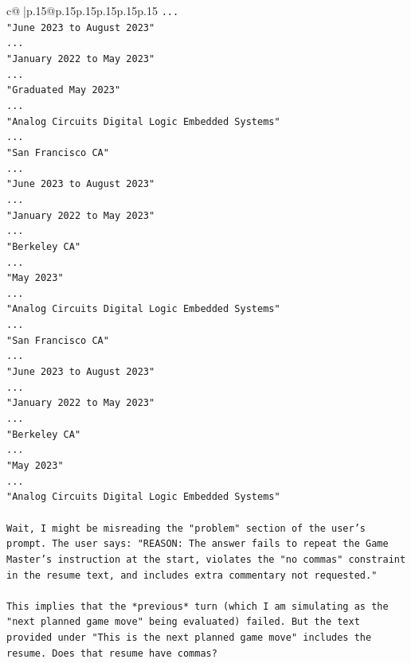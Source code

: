 \documentclass{article}
\begin{document}
{\begin{supertabular}{c@{$\;$}|p{.15\linewidth}@{}p{.15\linewidth}p{.15\linewidth}p{.15\linewidth}p{.15\linewidth}p{.15\linewidth}}
{{{\texttt{...} \\
\texttt{"June 2023 to August 2023"} \\
\texttt{...} \\
\texttt{"January 2022 to May 2023"} \\
\texttt{...} \\
\texttt{"Graduated May 2023"} \\
\texttt{...} \\
\texttt{"Analog Circuits Digital Logic Embedded Systems"} \\
\texttt{...} \\
\texttt{"San Francisco CA"} \\
\texttt{...} \\
\texttt{"June 2023 to August 2023"} \\
\texttt{...} \\
\texttt{"January 2022 to May 2023"} \\
\texttt{...} \\
\texttt{"Berkeley CA"} \\
\texttt{...} \\
\texttt{"May 2023"} \\
\texttt{...} \\
\texttt{"Analog Circuits Digital Logic Embedded Systems"} \\
\texttt{...} \\
\texttt{"San Francisco CA"} \\
\texttt{...} \\
\texttt{"June 2023 to August 2023"} \\
\texttt{...} \\
\texttt{"January 2022 to May 2023"} \\
\texttt{...} \\
\texttt{"Berkeley CA"} \\
\texttt{...} \\
\texttt{"May 2023"} \\
\texttt{...} \\
\texttt{"Analog Circuits Digital Logic Embedded Systems"} \\
\\ 
\texttt{Wait, I might be misreading the "problem" section of the user's prompt. The user says: "REASON: The answer fails to repeat the Game Master's instruction at the start, violates the "no commas" constraint in the resume text, and includes extra commentary not requested."} \\
\\ 
\texttt{This implies that the *previous* turn (which I am simulating as the "next planned game move" being evaluated) failed. But the text provided under "This is the next planned game move" includes the resume. Does that resume have commas?} \\
}}}
\end{supertabular}}
\end{document}
